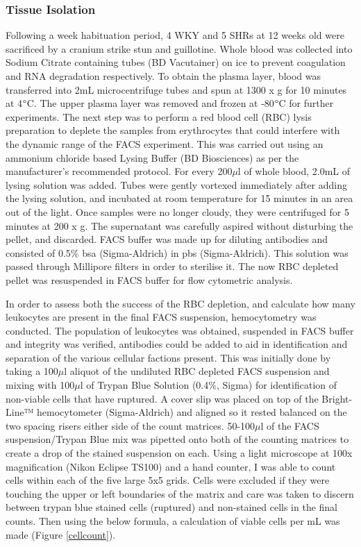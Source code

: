 \subsubsection{Tissue Isolation}

Following a week habituation period, 4 WKY and 5 SHRs at 12 weeks old were sacrificed by a cranium strike stun and guillotine. Whole blood was collected into Sodium Citrate containing tubes (BD Vacutainer) on ice to prevent coagulation and RNA degradation respectively. To obtain the plasma layer, blood was transferred into 2mL microcentrifuge tubes and spun at 1300 x g for 10 minutes at 4$\degree$C. The upper plasma layer was removed and frozen at -80$\degree$C for further experiments. The next step was to perform a red blood cell (RBC) lysis preparation to deplete the samples from erythrocytes that could interfere with the dynamic range of the FACS experiment. This was carried out using an ammonium chloride based Lysing Buffer (BD Biosciences) as per the manufacturer’s recommended protocol. For every 200$\mu$l of whole blood, 2.0mL of lysing solution was added. Tubes were gently vortexed immediately after adding the lysing solution, and incubated at room temperature for 15 minutes in an area out of the light. Once samples were no longer cloudy, they were centrifuged for 5 minutes at 200 x g. The supernatant was carefully aspired without disturbing the pellet, and discarded. FACS buffer was made up for diluting antibodies and consisted of 0.5\% \acrshort{bsa} (Sigma-Aldrich) in \acrshort{pbs} (Sigma-Aldrich). This solution was passed through Millipore filters in order to sterilise it. The now RBC depleted pellet was resuspended in FACS buffer for flow cytometric analysis. 

In order to assess both the success of the RBC depletion, and calculate how many leukocytes are present in the final FACS suspension, hemocytometry was conducted. The population of leukocytes was obtained, suspended in FACS buffer and integrity was verified, antibodies could be added to aid in identification and separation of the various cellular factions present. This was initially done by taking a 100$\mu$l aliquot of the undiluted RBC depleted FACS suspension and mixing with 100$\mu$l of Trypan Blue Solution (0.4\%, Sigma) for identification of non-viable cells that have ruptured. A cover slip was placed on top of the Bright-Line™ hemocytometer (Sigma-Aldrich) and aligned so it rested balanced on the two spacing risers either side of the count matrices. 50-100$\mu$l of the FACS suspension/Trypan Blue mix was pipetted onto both of the counting matrices to create a drop of the stained suspension on each. Using a light microscope at 100x magnification (Nikon Eclipse TS100) and a hand counter, I was able to count cells within each of the five large 5x5 grids. Cells were excluded if they were touching the upper or left boundaries of the matrix and care was taken to discern between trypan blue stained cells (ruptured) and non-stained cells in the final counts. Then using the below formula, a calculation of viable cells per mL was made (Figure \ref{cellcount}).

